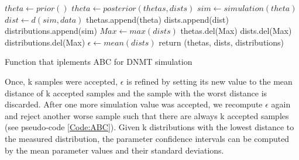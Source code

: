 \begin{algorithm}
\begin{algorithmic}
 
		\State $theta \gets prior()$
	\Else
		\State $theta \gets posterior(thetas, dists)$
	\EndIf
	\State $sim \gets simulation(theta)$
	\State $dist \gets d(sim, data)$
		\State thetas.append(theta)
		\State dists.append(dist)
		\State distributions.append(sim)
			\State $Max \gets max(dists)$
			\State thetas.del(Max)
			\State dists.del(Max)
			\State distributions.del(Max)
			\State $\epsilon \gets mean(dists)$
		\EndIf
	\EndIf
\EndFor
\State return (thetas, dists, distributions)
\EndProcedure
\end{algorithmic}
\caption{\label{Code:ABC} Function that iplements ABC for DNMT simulation}
\end{algorithm}

Once, k samples were accepted, $\epsilon$ is refined by setting its new value to the mean distance of k accepted samples and the sample with the worst distance is discarded. After one more simulation value was accepted, we recompute $\epsilon$ again and reject another worse sample such that there are always k accepted samples (see pseudo-code \ref{Code:ABC}). Given k distributions with the lowest distance to the measured distribution, the parameter confidence intervals can be computed by the mean parameter values and their standard deviations.